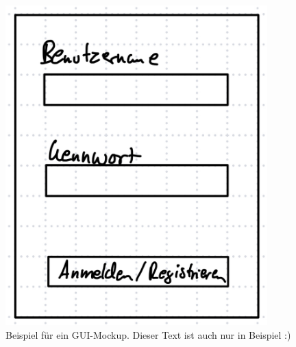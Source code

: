 \begin{figure}
	\centering
	\includegraphics[width=0.9\textwidth]{img/login}
	\caption{Beispiel für ein GUI-Mockup. Dieser Text ist auch nur in Beispiel :)}
	\label{gui:login}
\end{figure}